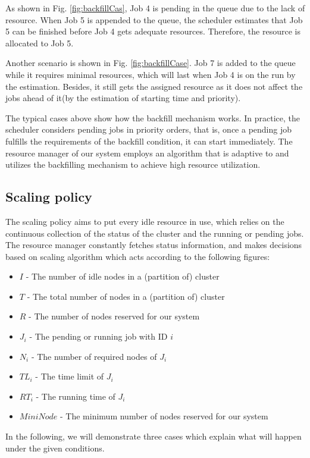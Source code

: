 As shown in  Fig. \ref{fig:backfillCas}, Job 4 is pending in the queue due to the lack of resource.
When Job 5 is appended to the queue, the scheduler estimates that Job 5 can be finished before Job 4 gets adequate resources. 
Therefore, the resource is allocated to Job 5.

Another scenario is shown in Fig. \ref{fig:backfillCase}. Job 7 is added to the queue while it requires minimal resources, which will last when Job 4 is on the run by the estimation. 
Besides, it still gets the assigned resource as it does not affect the jobs ahead of it(by the estimation of starting time and priority).

The typical cases above show how the backfill mechanism works. 
In practice, the scheduler considers pending jobs in priority orders, that is, once a pending job fulfills the requirements of the backfill condition, it can start immediately. 
The resource manager  of our system employs an algorithm that is adaptive to and utilizes the backfilling mechanism to achieve high resource utilization.

\subsection{Scaling policy}
The scaling policy aims to put every idle resource in use, which relies on the continuous collection of the status of the cluster and the running or pending jobs. 
The resource manager constantly fetches status information, and makes decisions based on scaling algorithm which acts according to the following figures:
\begin{itemize}
    \item $I$ - The number of idle nodes in a (partition of) cluster
    \item $T$ - The total number of nodes in a (partition of) cluster
    \item $R$ - The number of nodes reserved for our system
    \item $J_{i}$ - The pending or running job with ID $i$  
    \item $N_{i}$ - The number of required nodes of $J_{i}$
    \item $TL_{i}$ - The time limit of $J_{i}$
    \item $RT_{i}$ - The running time of $J_{i}$
    \item $MiniNode$ - The minimum number of nodes reserved for our system
\end{itemize}

In the following, we will demonstrate three cases which explain what will happen under the given conditions.
